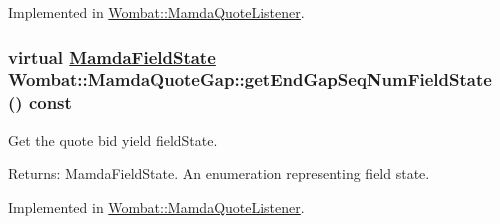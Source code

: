 Implemented in \hyperlink{classWombat_1_1MamdaQuoteListener_bc314f778476b46c392f6a775c3a9d61}{Wombat::Mamda\-Quote\-Listener}.\hypertarget{classWombat_1_1MamdaQuoteGap_79a42883fe6a8fcb0832fab98202b912}{
\subsubsection[getEndGapSeqNumFieldState]{\setlength{\rightskip}{0pt plus 5cm}virtual \hyperlink{namespaceWombat_93aac974f2ab713554fd12a1fa3b7d2a}{Mamda\-Field\-State} Wombat::Mamda\-Quote\-Gap::get\-End\-Gap\-Seq\-Num\-Field\-State () const}}
\label{classWombat_1_1MamdaQuoteGap_79a42883fe6a8fcb0832fab98202b912}


Get the quote bid yield field\-State. 

\begin{Desc}
\item[Returns:]Mamda\-Field\-State. An enumeration representing field state. \end{Desc}


Implemented in \hyperlink{classWombat_1_1MamdaQuoteListener_65056fc3d3db0cb1eef24134de986b33}{Wombat::Mamda\-Quote\-Listener}.